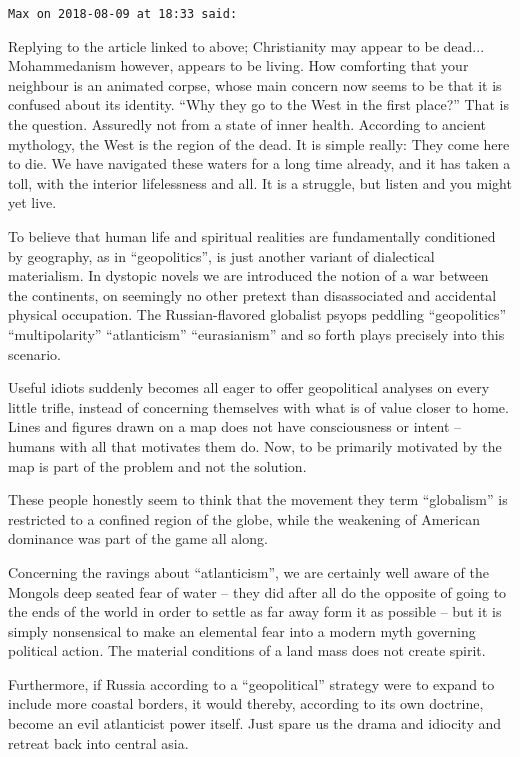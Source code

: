 \begin{footnotesize}
\begin{sffamily}
\texttt{Max on 2018-08-09 at 18:33 said:}

Replying to the article linked to above; Christianity may appear to be dead... Mohammedanism however, appears to be living. How comforting that your neighbour is an animated corpse, whose main concern now seems to be that it is confused about its identity. ``Why they go to the West in the first place?'' That is the question. Assuredly not from a state of inner health. According to ancient mythology, the West is the region of the dead. It is simple really: They come here to die. We have navigated these waters for a long time already, and it has taken a toll, with the interior lifelessness and all. It is a struggle, but listen and you might yet live.

To believe that human life and spiritual realities are fundamentally conditioned by geography, as in ``geopolitics'', is just another variant of dialectical materialism. In dystopic novels we are introduced the notion of a war between the continents, on seemingly no other pretext than disassociated and accidental physical occupation. The Russian-flavored globalist psyops peddling ``geopolitics'' ``multipolarity'' ``atlanticism'' ``eurasianism'' and so forth plays precisely into this scenario.

Useful idiots suddenly becomes all eager to offer geopolitical analyses on every little trifle, instead of concerning themselves with what is of value closer to home. Lines and figures drawn on a map does not have consciousness or intent -- humans with all that motivates them do. Now, to be primarily motivated by the map is part of the problem and not the solution.

These people honestly seem to think that the movement they term ``globalism'' is restricted to a confined region of the globe, while the weakening of American dominance was part of the game all along.

Concerning the ravings about ``atlanticism'', we are certainly well aware of the Mongols deep seated fear of water -- they did after all do the opposite of going to the ends of the world in order to settle as far away form it as possible -- but it is simply nonsensical to make an elemental fear into a modern myth governing political action. The material conditions of a land mass does not create spirit.

Furthermore, if Russia according to a ``geopolitical'' strategy were to expand to include more coastal borders, it would thereby, according to its own doctrine, become an evil atlanticist power itself. Just spare us the drama and idiocity and retreat back into central asia.


\end{sffamily}
\end{footnotesize}

